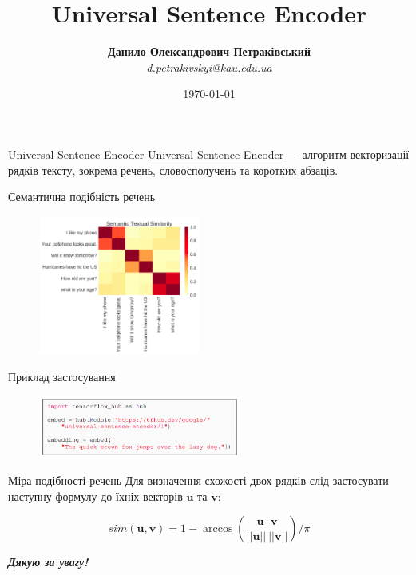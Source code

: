 \documentclass[mathserif]{beamer}
\title{Universal Sentence Encoder}
\institute{Державна наукова установа \\ ``Київський академічний університет``}
\author[Д.О.~Петраківський]{\textbf{Данило Олександрович Петраківський} \\ {\textsl{d.petrakivskyi@kau.edu.ua}}}
\date{\today}
\begin{document}
    \frame{\titlepage}

    \begin{frame}{Universal Sentence Encoder}
        \href{https://arxiv.org/abs/1803.11175}{Universal Sentence Encoder} --- алгоритм векторизації рядків тексту,
        зокрема речень, словосполучень та коротких абзаців.
    \end{frame}

    \begin{frame}{Семантична подібність речень}
        \begin{figure}[h!]
            \centering
            \includegraphics[width=200px]{images/use-sts}
        \end{figure}
    \end{frame}

    \begin{frame}{Приклад застосування}
        \begin{figure}[h!]
            \centering
            \includegraphics[width=250px]{images/use-code}
        \end{figure}
    \end{frame}

    \begin{frame}{Міра подібності речень}
        Для визначення схожості двох рядків слід застосувати наступну формулу до їхніх векторів $\boldsymbol{u}$ та
        $\boldsymbol{v}$:

        \[
            sim(\boldsymbol{u}, \boldsymbol{v})
            = 1
            - \arccos \left(\frac{\boldsymbol{u} \cdot \boldsymbol{v}}{||\boldsymbol{u}|| \ ||\boldsymbol{v}||}\right) / \pi
        \]
    \end{frame}

    \begin{frame}
        \begin{center}
            \Huge \bfseries \itshape Дякую за увагу!
        \end{center}
    \end{frame}
\end{document}
